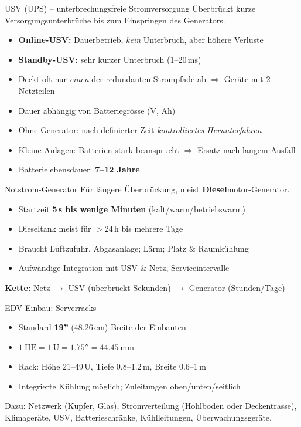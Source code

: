 \documentclass[a4paper, fontsize=7pt]{scrartcl}
\begin{document}
\begin{mainbox}{USV (UPS) -- unterbrechungsfreie Stromversorgung}
Überbrückt kurze Versorgungsunterbrüche bis zum Einspringen des Generators.
\begin{itemize}
    \item \textbf{Online-USV:} Dauerbetrieb, \emph{kein} Unterbruch, aber höhere
          Verluste
    \item \textbf{Standby-USV:} sehr kurzer Unterbruch (1--20\,ms)
\end{itemize}
\begin{itemize}
    \item Deckt oft nur \emph{einen} der redundanten Strompfade ab
          $\Rightarrow$ Geräte mit 2 Netzteilen
    \item Dauer abhängig von Batteriegrösse (V, Ah)
    \item Ohne Generator: nach definierter Zeit \emph{kontrolliertes Herunterfahren}
    \item Kleine Anlagen: Batterien stark beansprucht $\Rightarrow$ Ersatz nach
          langem Ausfall
    \item Batterielebensdauer: \textbf{7--12 Jahre}
\end{itemize}
\end{mainbox}

\begin{mainbox}{Notstrom-Generator}
Für längere Überbrückung, meist \textbf{Diesel}motor-Generator.
\begin{itemize}
    \item Startzeit \textbf{5\,s bis wenige Minuten} (kalt/warm/betriebswarm)
    \item Dieseltank meist für $>$24\,h bis mehrere Tage
    \item Braucht Luftzufuhr, Abgasanlage; Lärm; Platz \& Raumkühlung
    \item Aufwändige Integration mit USV \& Netz, Serviceintervalle
\end{itemize}
\textbf{Kette:} Netz $\to$ USV (überbrückt Sekunden) $\to$ Generator (Stunden/Tage)
\end{mainbox}

\begin{mainbox}{EDV-Einbau: Serverracks}
\begin{itemize}
    \item Standard \textbf{19''} (48.26\,cm) Breite der Einbauten
    \item $\boxed{1\ \text{HE} = 1\ \text{U} = 1.75'' = 44.45\ \text{mm}}$
    \item Rack: Höhe 21--49\,U, Tiefe 0.8--1.2\,m, Breite 0.6--1\,m
    \item Integrierte Kühlung möglich; Zuleitungen oben/unten/seitlich
\end{itemize}
Dazu: Netzwerk (Kupfer, Glas), Stromverteilung (Hohlboden oder Deckentrasse),
Klimageräte, USV, Batterieschränke, Kühlleitungen, Überwachungsgeräte.
\end{mainbox}
\end{document}
